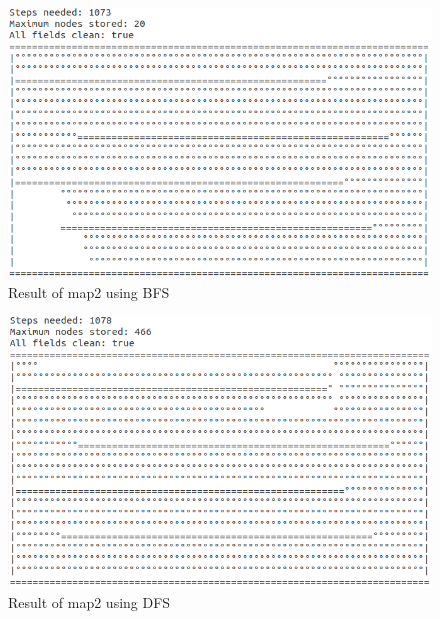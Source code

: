 \documentclass[paper=a4, fontsize=11pt]{scrartcl} %
\numberwithin{equation}{section} %
\numberwithin{figure}{section} %
\numberwithin{table}{section} %
\begin{document}
\begin{figure}[Ht]
	\centering
  \includegraphics[width=1\textwidth]{images/map2_bfs.png}
	\caption{Result of map2 using BFS}
	\label{fig:map2_bfs}
\end{figure}


\begin{figure}[Ht]
	\centering
  \includegraphics[width=1\textwidth]{images/map2_dfs.png}
	\caption{Result of map2 using DFS}
	\label{fig:map2_dfs}
\end{figure}
\end{document}
